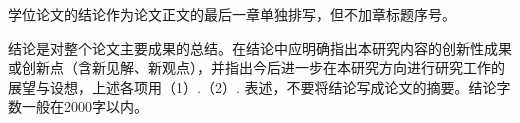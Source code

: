 
\begin{conclusions}

学位论文的结论作为论文正文的最后一章单独排写，但不加章标题序号。

结论是对整个论文主要成果的总结。在结论中应明确指出本研究内容的创新性成果或创新点（含新见解、新观点），并指出今后进一步在本研究方向进行研究工作的展望与设想，上述各项用（1）.（2）.  表述，不要将结论写成论文的摘要。结论字数一般在2000字以内。

\end{conclusions}
